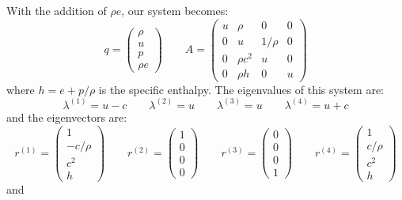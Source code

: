 With the addition of $\rho e$, our system becomes:
\begin{equation}
q = \left ( \begin{array}{c} \rho \\ u \\ p \\ \rho e \end{array} \right )
%
\qquad
%
A = \left ( \begin{array}{cccc} u & \rho     & 0      & 0 \\
                                0 & u        & 1/\rho & 0 \\
                                0 & \rho c^2 & u      & 0 \\
                                0 & \rho h   & 0      & u
            \end{array} \right )
\end{equation}
where $h = e + p/\rho$ is the specific enthalpy.  The eigenvalues of this
system are:
\begin{equation}
\lambda^{(1)} = u - c \qquad
\lambda^{(2)} = u  \qquad
\lambda^{(3)} = u  \qquad
\lambda^{(4)} = u + c
\end{equation}
and the eigenvectors are:
\begin{equation}
r^{(1)} = \left ( \begin{array}{c} 1 \\ -c/\rho \\ c^2 \\ h \end{array} \right )
\qquad
r^{(2)} = \left ( \begin{array}{c} 1 \\ 0 \\ 0 \\ 0 \end{array} \right )
\qquad
r^{(3)} = \left ( \begin{array}{c} 0 \\ 0 \\ 0 \\ 1 \end{array} \right )
\qquad
r^{(4)} = \left ( \begin{array}{c} 1 \\ c/\rho \\ c^2 \\ h \end{array} \right )
\end{equation}
and
